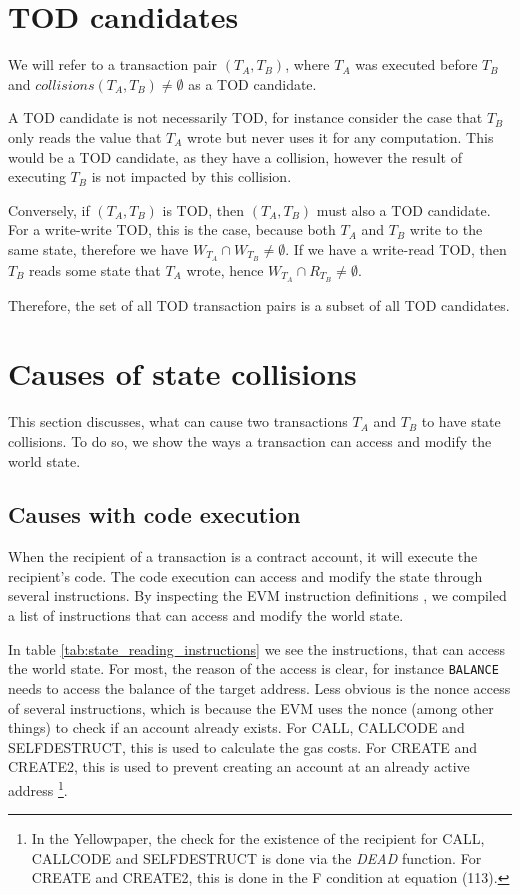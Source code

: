 \documentclass[draft,final]{vutinfth} %
\begin{document}
\section{TOD candidates}

We will refer to a transaction pair $(T_A, T_B)$, where $T_A$ was executed before $T_B$ and $collisions(T_A, T_B) \neq \emptyset$ as a TOD candidate.

A TOD candidate is not necessarily TOD, for instance consider the case that $T_B$ only reads the value that $T_A$ wrote but never uses it for any computation. This would be a TOD candidate, as they have a collision, however the result of executing $T_B$ is not impacted by this collision.

Conversely, if $(T_A, T_B)$ is TOD, then $(T_A, T_B)$ must also a TOD candidate. For a write-write TOD, this is the case, because both $T_A$ and $T_B$ write to the same state, therefore we have $W_{T_A} \cap W_{T_B} \neq \emptyset$. If we have a write-read TOD, then $T_B$ reads some state that $T_A$ wrote, hence $W_{T_A} \cap R_{T_B} \neq \emptyset$.

Therefore, the set of all TOD transaction pairs is a subset of all TOD candidates.

\section{Causes of state collisions}

This section discusses, what can cause two transactions $T_A$ and $T_B$ to have state collisions. To do so, we show the ways a transaction can access and modify the world state.

\subsection{Causes with code execution}

When the recipient of a transaction is a contract account, it will execute the recipient's code. The code execution can access and modify the state through several instructions. By inspecting the EVM instruction definitions \cite[p.30-38]{wood_ethereum_2024}\cite{smlxl_evm_2024}, we compiled a list of instructions that can access and modify the world state.

In table \ref{tab:state_reading_instructions} we see the instructions, that can access the world state. For most, the reason of the access is clear, for instance \verb|BALANCE| needs to access the balance of the target address. Less obvious is the nonce access of several instructions, which is because the EVM uses the nonce (among other things) to check if an account already exists\cite[p.4]{wood_ethereum_2024}. For CALL, CALLCODE and SELFDESTRUCT, this is used to calculate the gas costs. \cite[p.37-38]{wood_ethereum_2024} For CREATE and CREATE2, this is used to prevent creating an account at an already active address \cite[p.11]{wood_ethereum_2024}\footnote{In the Yellowpaper, the check for the existence of the recipient for CALL, CALLCODE and SELFDESTRUCT is done via the \emph{DEAD} function. For CREATE and CREATE2, this is done in the F condition at equation (113).}.
\end{document}
